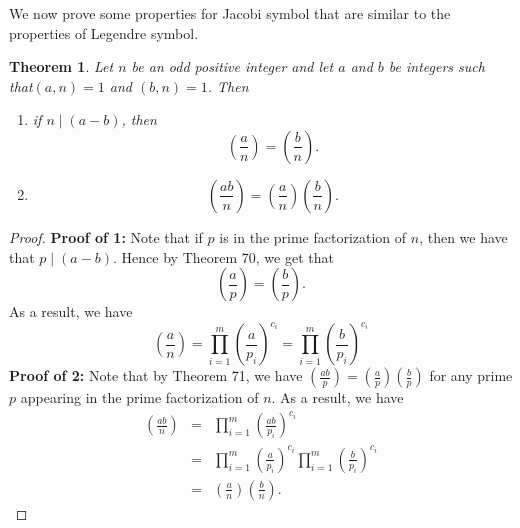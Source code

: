 \documentclass[12pt,letterpaper]{book}
\newtheorem{theorem}{Theorem}
\begin{document}
We now prove some properties for Jacobi symbol that are similar to
the properties of Legendre symbol.

\begin{theorem}
Let $n$ be an odd positive integer and let $a$ and $b$ be integers
such that$(a,n)=1$ and $(b,n)=1$.  Then
\begin{enumerate}
\item{if $n \mid (a-b)$, then
\begin{equation*}
\left(\frac{a}{n}\right)=\left(\frac{b}{n}\right).\end{equation*}}
\item{\begin{equation*}\left(\frac{ab}{n}\right)=\left(\frac{a}{n}\right)\left(\frac{b}{n}\right).\end{equation*}}
\end{enumerate}
\end{theorem}
\begin{proof}
\textbf{Proof of 1:} Note that if $p$ is in the prime factorization
of $n$, then we have that $p\mid (a-b)$.  Hence by Theorem 70, we
get that
\begin{equation*}
\left(\frac{a}{p}\right)=\left(\frac{b}{p}\right).
\end{equation*}
As a result, we have
\begin{equation*}
\left(\frac{a}{n}\right)=\prod_{i=1}^m\left(\frac{a}{p_i}\right)^{c_i}=
\prod_{i=1}^{m}\left(\frac{b}{p_i}\right)^{c_i}
\end{equation*}
\textbf{Proof of 2:} Note that by Theorem 71, we have
$\left(\frac{ab}{p}\right)=\left(\frac{a}{p}\right)\left(\frac{b}{p}\right)$
for any prime $p$ appearing in the prime factorization of $n$.  As a
result, we have
\begin{eqnarray*}
\left(\frac{ab}{n}\right)&=&\prod_{i=1}^m\left(\frac{ab}{p_i}\right)^{c_i}\\
&=&\prod_{i=1}^m\left(\frac{a}{p_i}\right)^{c_i}\prod_{i=1}^m\left(\frac{b}{p_i}\right)^{c_i}
\\&=&\left(\frac{a}{n}\right)\left(\frac{b}{n}\right).
\end{eqnarray*}
\end{proof}
\end{document}
